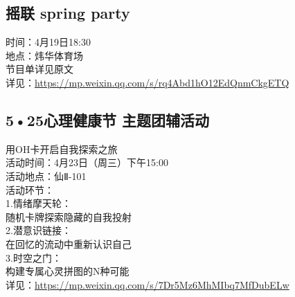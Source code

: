 \documentclass[letterpaper, 12pt]{article}
\begin{document}
\begin{multicols}{2}
\subsection{摇联 spring party}
时间：4月19日18:30
\\地点：炜华体育场
\\节目单详见原文
\\详见：\url{https://mp.weixin.qq.com/s/rq4Abd1hO12EdQnmCkgETQ}

\subsection{5•25心理健康节 主题团辅活动 }
用OH卡开启自我探索之旅
\\活动时间：4月23日（周三）下午15:00
\\活动地点：仙Ⅱ-101
\\活动环节：
\\1.情绪摩天轮：
\\随机卡牌探索隐藏的自我投射
\\2.潜意识链接：
\\在回忆的流动中重新认识自己
\\3.时空之门：
\\构建专属心灵拼图的N种可能
\\详见：\url{https://mp.weixin.qq.com/s/7Dr5Mz6MhMIbq7MfDubELw}
\end{multicols}
\end{document}
